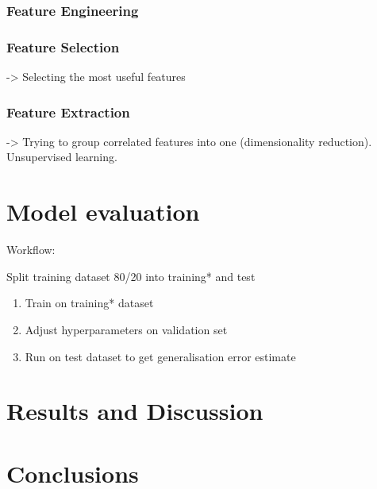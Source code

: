\documentclass[
  11pt,
  a4paper,
  DIV=12,captions=tableheading,oneside]{scrbook}
\providecommand{\tightlist}{%
  \setlength{\itemsep}{0pt}\setlength{\parskip}{0pt}}
\providecommand{\tightlist}{%
  \setlength{\itemsep}{0pt}\setlength{\parskip}{0pt}}
\begin{document}
\hypertarget{feature-engineering-1}{%
\subsection{Feature Engineering}\label{feature-engineering-1}}

\hypertarget{feature-selection-1}{%
\subsection{Feature Selection}\label{feature-selection-1}}

-\textgreater{} Selecting the most useful features

\hypertarget{feature-extraction}{%
\subsection{Feature Extraction}\label{feature-extraction}}

-\textgreater{} Trying to group correlated features into one (dimensionality reduction). Unsupervised learning.

\hypertarget{model-evaluation-1}{%
\chapter{Model evaluation}\label{model-evaluation-1}}

Workflow:

Split training dataset 80/20 into training* and test

\begin{enumerate}
\def\labelenumi{\arabic{enumi}.}
\tightlist
\item
  Train on training* dataset
\item
  Adjust hyperparameters on validation set
\item
  Run on test dataset to get generalisation error estimate
\end{enumerate}

\hypertarget{results-and-discussion}{%
\chapter{Results and Discussion}\label{results-and-discussion}}

\hypertarget{conclusions}{%
\chapter{Conclusions}\label{conclusions}}
\end{document}
